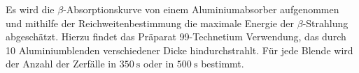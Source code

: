 Es wird die \texorpdfstring{$\beta$}{Beta}-Absorptionskurve von einem Aluminiumabsorber aufgenommen und 
mithilfe der Reichweitenbestimmung die maximale Energie der \texorpdfstring{$\beta$}{Beta}-Strahlung abgeschätzt.
Hierzu findet das Präparat 99-Technetium Verwendung, das durch 10 Aluminiumblenden verschiedener Dicke hindurchstrahlt.
Für jede Blende wird der Anzahl der Zerfälle in $\SI{350}{\second}$ oder in $\SI{500}{\second}$ bestimmt.